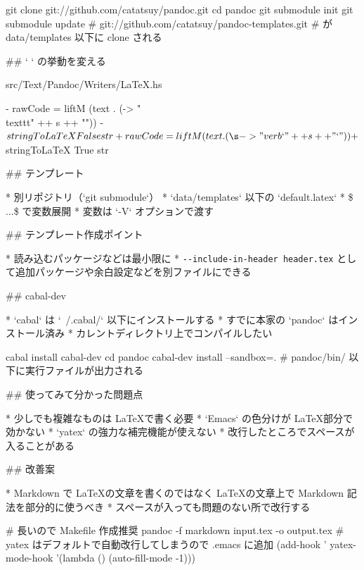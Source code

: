 \small

    git clone git://github.com/catatsuy/pandoc.git
    cd pandoc
    git submodule init
    git submodule update
    # git://github.com/catatsuy/pandoc-templates.git
    # が data/templates 以下に clone される


## ` ` の挙動を変える

\small

    src/Text/Pandoc/Writers/LaTeX.hs

\footnotesize

    - rawCode = liftM (text . (\s -> "\\texttt{" ++ s ++ "}"))
    -                  $ stringToLaTeX False str
    + rawCode = liftM (text . (\s -> "\\verb`" ++ s ++ "`"))
    +                  $ stringToLaTeX True str


## テンプレート

* 別リポジトリ（`git submodule`）
* `data/templates` 以下の `default.latex`
* \$ ...\$ で変数展開
    * 変数は `-V` オプションで渡す


## テンプレート作成ポイント

* 読み込むパッケージなどは最小限に
* \verb+--include-in-header header.tex+ として追加パッケージや余白設定などを別ファイルにできる


## cabal-dev

* `cabal` は `~/.cabal/` 以下にインストールする
* すでに本家の `pandoc` はインストール済み
* カレントディレクトリ上でコンパイルしたい

\small

    cabal install cabal-dev
    cd pandoc
    cabal-dev install --sandbox=.
    # pandoc/bin/ 以下に実行ファイルが出力される


## 使ってみて分かった問題点

* 少しでも複雑なものは \LaTeX で書く必要
* `Emacs` の色分けが \LaTeX 部分で効かない
* `yatex` の強力な補完機能が使えない
* 改行したところでスペースが入ることがある


## 改善案

* Markdown で \LaTeX の文章を書くのではなく \LaTeX の文章上で Markdown 記法を部分的に使うべき
* スペースが入っても問題のない所で改行する

\small

    # 長いので Makefile 作成推奨
    pandoc -f markdown input.tex -o output.tex
    # yatex はデフォルトで自動改行してしまうので .emacs に追加
    (add-hook ' yatex-mode-hook '(lambda ()
                               (auto-fill-mode -1)))


